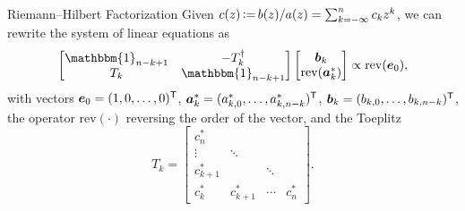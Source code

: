 \begin{frame}{Riemann--Hilbert Factorization}
    Given $c(z) \operatorname{\vcentcolon=} b(z)/a(z) = \sum_{k=-\infty}^nc_kz^k$, we can rewrite the system of linear equations as
    \begin{equation}
        \left[\begin{matrix}
            \mathbbm{1}_{n-k+1} & -T_k^\dagger \\
            T_k & \mathbbm{1}_{n-k+1}
        \end{matrix}\right] \left[\begin{matrix}
            \vec{b}_k \\ \mathrm{rev}(\vec{a}_k^*)
        \end{matrix}\right] \propto \mathrm{rev}(\vec{e}_0),
    \end{equation}
    with vectors $\boldsymbol{e}_0=(1,0,\ldots,0)^{\mathsf{T}}$, $\boldsymbol{a}_k^* = (a_{k,0}^*,\ldots,a_{k,n-k}^*)^{\mathsf{T}}$, $\boldsymbol{b}_k = (b_{k,0},\ldots,b_{k,n-k})^{\mathsf{T}}$, the operator $\mathrm{rev}(\cdot)$ reversing the order of the vector, and the Toeplitz
    \begin{equation}
        T_k = \left[\begin{matrix}
            c_n^* \\
            \vdots & \ddots \\
            c_{k+1}^* & & \ddots \\
            c_k^* & c_{k+1}^* & \cdots & c_n^*
        \end{matrix}\right].
    \end{equation}
\end{frame}
